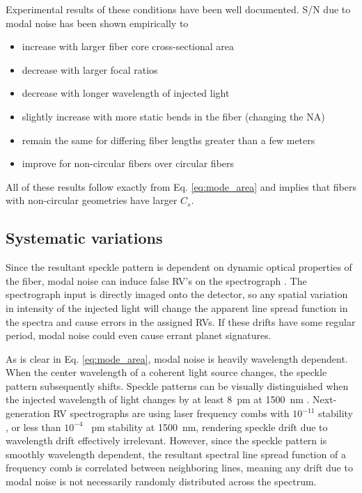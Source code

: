 \documentclass[twocolumn]{emulateapj}
\begin{document}
Experimental results of these conditions have been well documented. S/N due to modal noise has been shown empirically to
\begin{itemize}
\item increase with larger fiber core cross-sectional area \citep{Sablowski2015, Lemke2010}
\item decrease with larger focal ratios \citep{Sablowski2015, Baudrand2001}
\item decrease with longer wavelength of injected light \citep{Baudrand2001}
\item slightly increase with more static bends in the fiber (changing the NA) \citep{Imai1979}
\item remain the same for differing fiber lengths greater than a few meters \citep{Baudrand2001}
\item improve for non-circular fibers over circular fibers \citep{Sturmer2016, Sablowski2015}
\end{itemize}
All of these results follow exactly from Eq. \ref{eq:mode_area} and implies that fibers with non-circular geometries have larger $C_{s}$.

\subsection{Systematic variations}

Since the resultant speckle pattern is dependent on dynamic optical properties of the fiber, modal noise can induce false RV's on the spectrograph \citep{Mahadevan2014}. The spectrograph input is directly imaged onto the detector, so any spatial variation in intensity of the injected light will change the apparent line spread function in the spectra and cause errors in the assigned RVs. If these drifts have some regular period, modal noise could even cause errant planet signatures.

As is clear in Eq. \ref{eq:mode_area}, modal noise is heavily wavelength dependent. When the center wavelength of a coherent light source changes, the speckle pattern subsequently shifts.  Speckle patterns can be visually distinguished when the injected wavelength of light changes by at least \SI{8}{\pico\meter} at \SI{1500}{\nano\meter} \citep{Redding2013}. Next-generation RV spectrographs are using laser frequency combs with $10^{-11}$ stability \citep{Probst2014}, or less than $10^{-4}$ \SI{}{\pico\meter} stability at \SI{1500}{\nano\meter}, rendering speckle drift due to wavelength drift effectively irrelevant. However, since the speckle pattern is smoothly wavelength dependent, the resultant spectral line spread function of a frequency comb is correlated between neighboring lines, meaning any drift due to modal noise is not necessarily randomly distributed across the spectrum.
\end{document}
